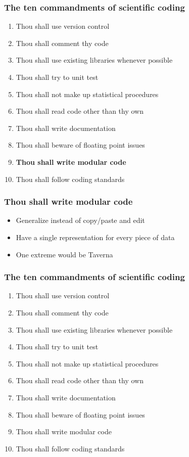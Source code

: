 \documentclass[slidestop]{beamer}
\begin{document}
\begin{frame}
  \frametitle{The ten commandments of scientific coding}
  \begin{enumerate}
    \item Thou shall use version control
    \item Thou shall comment thy code
    \item Thou shall use existing libraries whenever possible
    \item Thou shall try to unit test
    \item Thou shall not make up statistical procedures
    \item Thou shall read code other than thy own
    \item Thou shall write documentation
    \item Thou shall beware of floating point issues
    \item {\bf Thou shall write modular code}
    \item Thou shall follow coding standards
  \end{enumerate}
\end{frame}

\begin{frame}
  \frametitle{Thou shall write modular code}
  \begin{itemize}[<+->]
    \item Generalize instead of copy/paste and edit
    \item Have a single representation for every piece of data
    \item One extreme would be Taverna
  \end{itemize}
\end{frame}

\begin{frame}
  \frametitle{The ten commandments of scientific coding}
  \begin{enumerate}
    \item Thou shall use version control
    \item Thou shall comment thy code
    \item Thou shall use existing libraries whenever possible
    \item Thou shall try to unit test
    \item Thou shall not make up statistical procedures
    \item Thou shall read code other than thy own
    \item Thou shall write documentation
    \item Thou shall beware of floating point issues
    \item Thou shall write modular code
    \item Thou shall follow coding standards
  \end{enumerate}
\end{frame}
\end{document}
